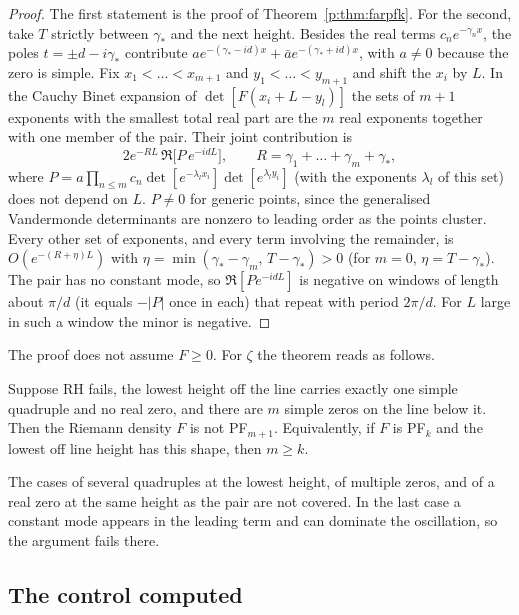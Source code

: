 \begin{proof}
The first statement is the proof of Theorem~\ref{p:thm:farpfk}. For the second, take $T$ strictly between $\gamma_*$ and the next height. Besides the real terms $c_ne^{-\gamma_nx}$, the poles $t=\pm d-i\gamma_*$ contribute $ae^{-(\gamma_*-id)x}+\bar ae^{-(\gamma_*+id)x}$, with $a\ne0$ because the zero is simple. Fix $x_1<\dots<x_{m+1}$ and $y_1<\dots<y_{m+1}$ and shift the $x_i$ by $L$. In the Cauchy Binet expansion of $\det[F(x_i+L-y_l)]$ the sets of $m+1$ exponents with the smallest total real part are the $m$ real exponents together with one member of the pair. Their joint contribution is
\[
2e^{-RL}\,\Re\big[P\,e^{-idL}\big],\qquad R=\gamma_1+\dots+\gamma_m+\gamma_*,
\]
where $P=a\prod_{n\le m}c_n\det[e^{-\lambda_lx_i}]\det[e^{\lambda_ly_i}]$ (with the exponents $\lambda_l$ of this set) does not depend on $L$. $P\ne0$ for generic points, since the generalised Vandermonde determinants are nonzero to leading order as the points cluster. Every other set of exponents, and every term involving the remainder, is $O(e^{-(R+\eta)L})$ with $\eta=\min(\gamma_*-\gamma_m,\,T-\gamma_*)>0$ (for $m=0$, $\eta=T-\gamma_*$). The pair has no constant mode, so $\Re[Pe^{-idL}]$ is negative on windows of length about $\pi/d$ (it equals $-|P|$ once in each) that repeat with period $2\pi/d$. For $L$ large in such a window the minor is negative.
\end{proof}

The proof does not assume $F\ge0$. For $\zeta$ the theorem reads as follows.

\begin{corollary}\label{p:cor:detect}
Suppose RH fails, the lowest height off the line carries exactly one simple quadruple and no real zero, and there are $m$ simple zeros on the line below it. Then the Riemann density $F$ is not PF$_{m+1}$. Equivalently, if $F$ is PF$_k$ and the lowest off line height has this shape, then $m\ge k$.
\end{corollary}

The cases of several quadruples at the lowest height, of multiple zeros, and of a real zero at the same height as the pair are not covered. In the last case a constant mode appears in the leading term and can dominate the oscillation, so the argument fails there.

\subsection{The control computed}

